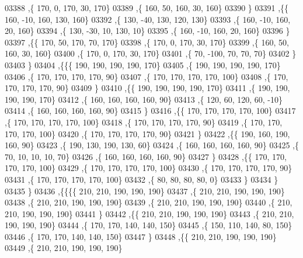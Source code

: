 \begin{DoxyCode}
03388     ,\{   170,     0,   170,    30,   170\}
03389     ,\{   160,    50,   160,    30,   160\}
03390     \}
03391    ,\{\{   160,   -10,   160,   130,   160\}
03392     ,\{   130,   -40,   130,   120,   130\}
03393     ,\{   160,   -10,   160,    20,   160\}
03394     ,\{   130,   -30,    10,   130,    10\}
03395     ,\{   160,   -10,   160,    20,   160\}
03396     \}
03397    ,\{\{   170,    50,   170,    70,   170\}
03398     ,\{   170,     0,   170,    30,   170\}
03399     ,\{   160,    50,   160,    30,   160\}
03400     ,\{   170,     0,   170,    30,   170\}
03401     ,\{    70,  -100,    70,    70,    70\}
03402     \}
03403    \}
03404   ,\{\{\{   190,   190,   190,   190,   170\}
03405     ,\{   190,   190,   190,   190,   170\}
03406     ,\{   170,   170,   170,   170,    90\}
03407     ,\{   170,   170,   170,   170,   100\}
03408     ,\{   170,   170,   170,   170,    90\}
03409     \}
03410    ,\{\{   190,   190,   190,   190,   170\}
03411     ,\{   190,   190,   190,   190,   170\}
03412     ,\{   160,   160,   160,   160,    90\}
03413     ,\{   120,    60,   120,    60,   -10\}
03414     ,\{   160,   160,   160,   160,    90\}
03415     \}
03416    ,\{\{   170,   170,   170,   170,   100\}
03417     ,\{   170,   170,   170,   170,   100\}
03418     ,\{   170,   170,   170,   170,    90\}
03419     ,\{   170,   170,   170,   170,   100\}
03420     ,\{   170,   170,   170,   170,    90\}
03421     \}
03422    ,\{\{   190,   160,   190,   160,    90\}
03423     ,\{   190,   130,   190,   130,    60\}
03424     ,\{   160,   160,   160,   160,    90\}
03425     ,\{    70,    10,    10,    10,    70\}
03426     ,\{   160,   160,   160,   160,    90\}
03427     \}
03428    ,\{\{   170,   170,   170,   170,   100\}
03429     ,\{   170,   170,   170,   170,   100\}
03430     ,\{   170,   170,   170,   170,    90\}
03431     ,\{   170,   170,   170,   170,   100\}
03432     ,\{    80,    80,    80,    80,     0\}
03433     \}
03434    \}
03435   \}
03436  ,\{\{\{\{   210,   210,   190,   190,   190\}
03437     ,\{   210,   210,   190,   190,   190\}
03438     ,\{   210,   210,   190,   190,   190\}
03439     ,\{   210,   210,   190,   190,   190\}
03440     ,\{   210,   210,   190,   190,   190\}
03441     \}
03442    ,\{\{   210,   210,   190,   190,   190\}
03443     ,\{   210,   210,   190,   190,   190\}
03444     ,\{   170,   170,   140,   140,   150\}
03445     ,\{   150,   110,   140,    80,   150\}
03446     ,\{   170,   170,   140,   140,   150\}
03447     \}
03448    ,\{\{   210,   210,   190,   190,   190\}
03449     ,\{   210,   210,   190,   190,   190\}

\end{DoxyCode}
